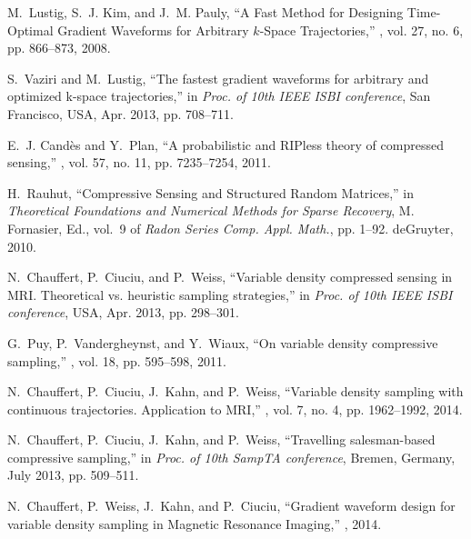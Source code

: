 \documentclass{article}
\begin{document}
{\footnotesize

\begin{thebibliography}{10}

M.~Lustig, S.~J. Kim, and J.~M. Pauly,
\newblock ``{A Fast Method for Designing Time-Optimal Gradient Waveforms for
  Arbitrary $k$-Space Trajectories},''
, vol. 27, no. 6, pp. 866--873,
  2008.

S.~Vaziri and M.~Lustig,
\newblock ``The fastest gradient waveforms for arbitrary and optimized k-space
  trajectories,''
\newblock in {\em Proc. of 10th IEEE ISBI conference}, San Francisco, USA, Apr. 2013, pp. 708--711.

E.~J. Cand{\`e}s and Y.~Plan,
\newblock ``A probabilistic and {RIP}less theory of compressed sensing,''
, vol. 57, no. 11, pp.
  7235--7254, 2011.

H.~Rauhut,
\newblock ``{C}ompressive {S}ensing and {S}tructured {R}andom {M}atrices,''
\newblock in {\em {T}heoretical {F}oundations and {N}umerical {M}ethods for
  {S}parse {R}ecovery}, {M}. {F}ornasier, Ed., vol.~9 of {\em {R}adon {S}eries
  {C}omp. {A}ppl. {M}ath.}, pp. 1--92. de{G}ruyter, 2010.

N.~Chauffert, P.~Ciuciu, and P.~Weiss,
\newblock ``Variable density compressed sensing in {MRI}. {T}heoretical {vs.}
  heuristic sampling strategies,''
\newblock in {\em Proc. of 10th IEEE ISBI conference}, USA, Apr. 2013, pp. 298--301.

G.~Puy, P.~Vandergheynst, and Y.~Wiaux,
\newblock ``On variable density compressive sampling,''
, vol. 18, pp. 595--598, 2011.

N.~Chauffert, P.~Ciuciu, J.~Kahn, and P.~Weiss,
\newblock ``Variable density sampling with continuous trajectories.
  {A}pplication to {MRI},''
, vol. 7, no. 4, pp. 1962--1992,
  2014.

N.~Chauffert, P.~Ciuciu, J.~Kahn, and P.~Weiss,
\newblock ``Travelling salesman-based compressive sampling,''
\newblock in {\em Proc. of 10th {SampTA} conference}, Bremen, Germany, July
  2013, pp. 509--511.

N.~Chauffert, P.~Weiss, J.~Kahn, and P.~Ciuciu,
\newblock ``Gradient waveform design for variable density sampling in Magnetic Resonance Imaging,''
,
  2014.


\end{thebibliography}}
\end{document}
